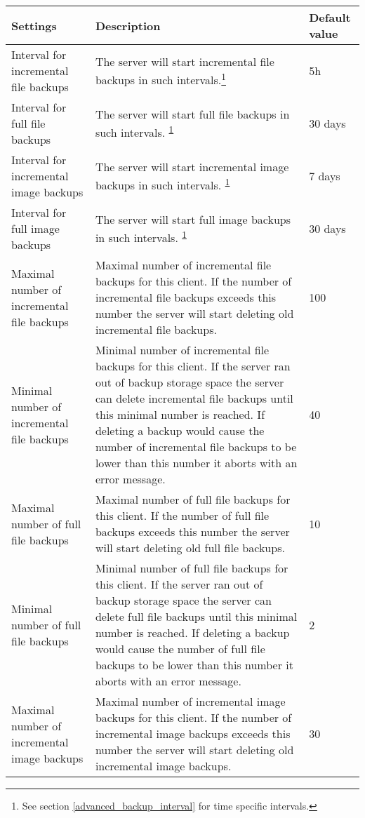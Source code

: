 \documentclass[a4paper,10pt]{article}
\begin{document}
\begin{longtable}{|p{}|p{}|p{}|}
\hline
Settings  & Description & Default value\\
\hline\hline
Interval for incremental file backups & The server will start incremental file backups in such intervals.\footnote{\label{advanced_backup_interval_note}See section \ref{advanced_backup_interval} for time specific intervals.} & 5h\\
\hline
Interval for full file backups & The server will start full file backups in such intervals. \textsuperscript{\ref{advanced_backup_interval_note}} & 30 days\\
\hline
Interval for incremental image backups & The server will start incremental image backups in such intervals. \textsuperscript{\ref{advanced_backup_interval_note}} & 7 days\\
\hline
Interval for full image backups & The server will start full image backups in such intervals. \textsuperscript{\ref{advanced_backup_interval_note}} & 30 days\\
\hline
Maximal number of incremental file backups & Maximal number of incremental file backups for this client. If the number of
 incremental file backups exceeds this number the server will start deleting old incremental file backups. & 100\\
\hline 
Minimal number of incremental file backups & Minimal number of incremental file backups for this client. If the server ran out of backup storage space the server can delete incremental file backups until this minimal number is reached. If deleting a backup would cause the number of incremental file backups to be lower than this number it aborts with an error message. & 40\\
\hline
Maximal number of full file backups & Maximal number of full file backups for this client. If the number of
 full file backups exceeds this number the server will start deleting old full file backups. & 10\\
\hline
Minimal number of full file backups & Minimal number of full file backups for this client. If the server ran out of backup storage space the server can delete full file backups until this minimal number is reached. If deleting a backup would cause the number of full file backups to be lower than this number it aborts with an error message. & 2\\
\hline
Maximal number of incremental image backups & Maximal number of incremental image backups for this client. If the number of incremental image backups exceeds this number the server will start deleting old incremental image backups. & 30\\

\end{longtable}
\end{document}
